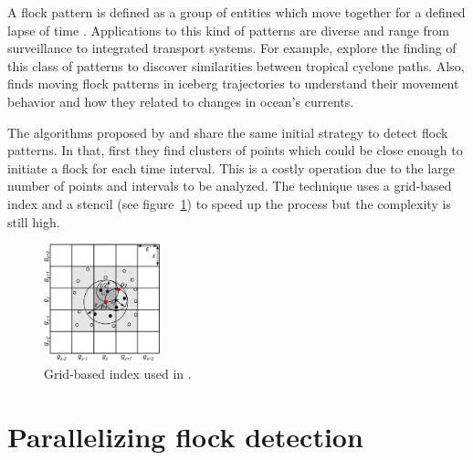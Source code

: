 \documentclass[12pt]{scrartcl}
\begin{document}
A flock pattern is defined as a group of entities which move together for a defined lapse of time \citep{benkert_reporting_2008}.  Applications to this kind of patterns are diverse and range from surveillance to integrated transport systems.  For example, \citep{turdukulov_visual_2014} explore the finding of this class of patterns to discover similarities between tropical cyclone paths. Also, \citep{calderon_romero_mining_2011} finds moving flock patterns in iceberg trajectories to understand their movement behavior and how they related to changes in ocean's currents. 
 
The algorithms proposed by \citep{vieira_-line_2009} and \citep{turdukulov_visual_2014} share the same initial strategy to detect flock patterns.  In that, first they find clusters of points which could be close enough to initiate a flock for each time interval.  This is a costly operation due to the large number of points and intervals to be analyzed.  The technique uses a grid-based index and a stencil (see figure~\ref{fig:grid}) to speed up the process but the complexity is still high.

\begin{figure}[t]
 \centering
 \includegraphics[width=0.3\textwidth]{./figures/grid.png}
 \caption{Grid-based index used in \citep{vieira_-line_2009}.}
 \label{fig:grid}
\end{figure}

\section{Parallelizing flock detection}\label{sec:flock}
% 
\end{document}
